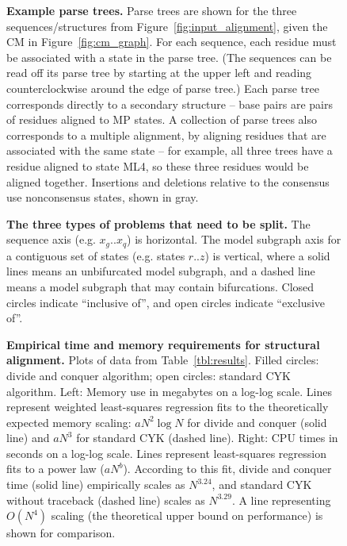 \documentclass[11pt]{article}
\begin{document}
\begin{figure}[h]
\caption{\textbf{Example parse trees.} Parse trees are shown for the
three sequences/structures from Figure~\ref{fig:input_alignment},
given the CM in Figure~\ref{fig:cm_graph}. For each sequence, each
residue must be associated with a state in the parse tree. (The
sequences can be read off its parse tree by starting at the upper left
and reading counterclockwise around the edge of parse tree.) Each
parse tree corresponds directly to a secondary structure -- base pairs
are pairs of residues aligned to MP states. A collection of parse
trees also corresponds to a multiple alignment, by aligning residues
that are associated with the same state -- for example, all three
trees have a residue aligned to state ML4, so these three residues
would be aligned together. Insertions and deletions relative to the
consensus use nonconsensus states, shown in gray.}
\label{fig:parsetrees}
\end{figure}

\begin{figure}[h]
\caption{\textbf{The three types of problems that need to be split.}
The sequence axis (e.g. $x_g..x_q$) is horizontal. The model subgraph
axis for a contiguous set of states (e.g. states $r..z$) is vertical,
where a solid lines means an unbifurcated model subgraph, and a dashed
line means a model subgraph that may contain bifurcations.  Closed
circles indicate ``inclusive of'', and open circles indicate
``exclusive of''.}
\label{fig:splitter_schematic}
\end{figure}

\begin{figure}[h]
\caption{\textbf{Empirical time and memory requirements for structural
alignment.} Plots of data from Table~\ref{tbl:results}. Filled
circles: divide and conquer algorithm; open circles: standard CYK
algorithm. Left: Memory use in megabytes on a log-log scale. Lines
represent weighted least-squares regression fits to the theoretically
expected memory scaling: $aN^2 \log N$ for divide and conquer (solid
line) and $aN^3$ for standard CYK (dashed line). Right: CPU times in
seconds on a log-log scale. Lines represent least-squares regression
fits to a power law ($aN^b$).  According to this fit, divide and
conquer time (solid line) empirically scales as $N^{3.24}$, and
standard CYK without traceback (dashed line) scales as $N^{3.29}$. A
line representing $O(N^4)$ scaling (the theoretical upper bound on
performance) is shown for comparison.}
\label{fig:graphs}
\end{figure}

\newpage



\fi
\end{document}
